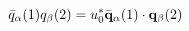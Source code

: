 \begin{equation}                      
\bar{q}_{\alpha}(1) q_{\beta}(2) = u_{0}^{*} \bar{\bf q}_{\alpha}(1)                       
\cdot{\bf q}_{\beta}(2)                      
\end{equation} 
